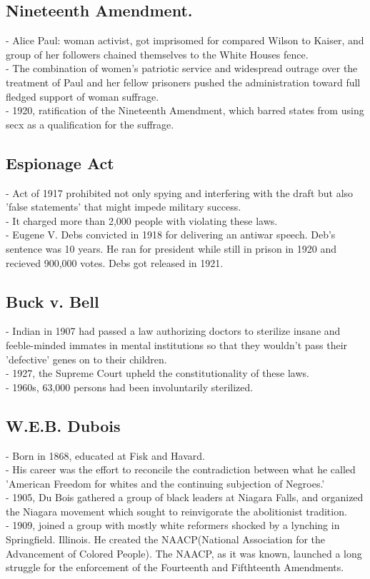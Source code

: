 \documentclass{article}
\begin{document}
\subsection{Nineteenth Amendment.}
- Alice Paul: woman activist, got imprisomed for compared Wilson to Kaiser, and group of her followers chained themselves to the White Houses fence.\\
- The combination of women's patriotic service and widespread outrage over the treatment of Paul and her fellow prisoners pushed the administration toward full fledged support of woman suffrage.\\
- 1920, ratification of the Nineteenth Amendment, which barred states from using secx as a qualification for the suffrage.\\

\subsection{Espionage Act}
- Act of 1917 prohibited not only spying and interfering with the draft but also 'false statements' that might impede military success. \\
- It charged more than 2,000 people with violating these laws. \\
- Eugene V. Debs convicted in 1918  for delivering an antiwar speech. Deb's sentence was 10 years. He ran for president while still in prison in 1920 and recieved 900,000 votes. Debs got released in 1921.\\

\subsection{ Buck v. Bell}
- Indian in 1907 had passed a law authorizing doctors to sterilize insane and feeble-minded immates in mental institutions so that they wouldn't pass their 'defective' genes on to their children.\\
- 1927, the Supreme Court upheld the constitutionality of these laws. \\
- 1960s, 63,000 persons had been involuntarily sterilized.\\

\subsection{W.E.B. Dubois}
- Born in 1868, educated at Fisk and Havard.\\
- His career was the effort to reconcile the contradiction between what he called 'American Freedom for whites and the continuing subjection of Negroes.' \\
- 1905, Du Bois gathered a group of black leaders at Niagara Falls, and organized the Niagara movement which sought to reinvigorate the abolitionist tradition.\\
- 1909, joined a group with mostly white reformers shocked by a lynching in Springfield. Illinois. He created the NAACP(National Association for the Advancement of Colored People). The NAACP, as it was known, launched a long struggle for the enforcement of the Fourteenth and Fifthteenth Amendments.\\
\end{document}
